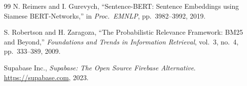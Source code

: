 \documentclass[12pt, a4paper]{article}
\begin{document}
\begin{thebibliography}{99}
  N. Reimers and I. Gurevych,
  ``Sentence-BERT: Sentence Embeddings using Siamese BERT-Networks,''
  in \textit{Proc.\ EMNLP}, pp.~3982--3992, 2019.

  S. Robertson and H. Zaragoza,
  ``The Probabilistic Relevance Framework: BM25 and Beyond,''
  \textit{Foundations and Trends in Information Retrieval},
  vol.~3, no.~4, pp.~333--389, 2009.

  Supabase Inc.,
  \textit{Supabase: The Open Source Firebase Alternative}.
  \url{https://supabase.com}, 2023.

\end{thebibliography}
\end{document}
